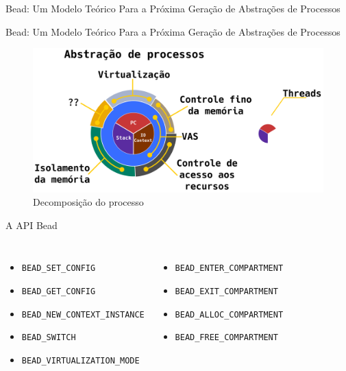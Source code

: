 \documentclass[xcolor={usenames,svgnames,dvipsnames},brazil,english,12pt,aspectratio=149]{beamer}
\newcommand\col{\column{.5\textwidth}}
\begin{document}
\begin{frame}{Bead: Um Modelo Teórico Para a Próxima Geração de Abstrações de Processos}
  
\end{frame}

\begin{frame}{Bead: Um Modelo Teórico Para a Próxima Geração de Abstrações de Processos}
  \begin{figure}[!h]
    \centering
    \includegraphics[width=\textwidth]{decomposicao_overview}
    \caption*{Decomposição do processo}
  \end{figure}
\end{frame}

\begin{frame}{A API Bead}
  \begin{columns}[t]
    \col
      \begin{itemize}
        \item \texttt{BEAD\_SET\_CONFIG}
        \item \texttt{BEAD\_GET\_CONFIG}
        \item \texttt{BEAD\_NEW\_CONTEXT\_INSTANCE}
        \item \texttt{BEAD\_SWITCH}
        \item \texttt{BEAD\_VIRTUALIZATION\_MODE}
      \end{itemize}
    \col
      \begin{itemize}
        \item \texttt{BEAD\_ENTER\_COMPARTMENT}
        \item \texttt{BEAD\_EXIT\_COMPARTMENT}
        \item \texttt{BEAD\_ALLOC\_COMPARTMENT}
        \item \texttt{BEAD\_FREE\_COMPARTMENT}
      \end{itemize}
  \end{columns}
\end{frame}
\end{document}
